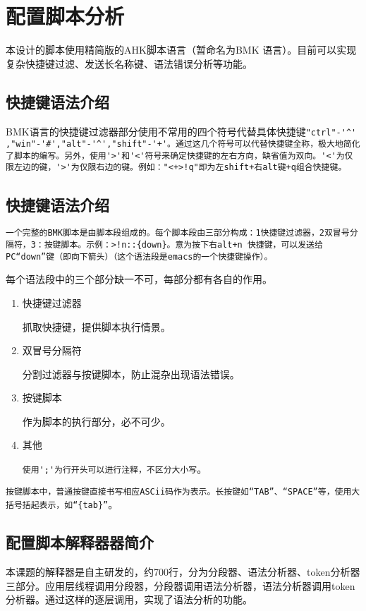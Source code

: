 \section{配置脚本分析}
本设计的脚本使用精简版的AHK脚本语言（暂命名为BMK 语言）。目前可以实现复杂快捷键过滤、发送长名称键、语法错误分析等功能。
\subsection{快捷键语法介绍}
BMK语言的快捷键过滤器部分使用不常用的四个符号代替具体快捷键\verb|"ctrl"-'^' ,"win"-'#',"alt"-'^',"shift"-'+'。通过这几个符号可以代替快捷键全称，极大地简化了脚本的编写。另外，使用'>'和'<'符号来确定快捷键的左右方向，缺省值为双向。'<'为仅限左边的键，'>'为仅限右边的键。例如："<+>!q"即为左shift+右alt键+q组合快捷键。|

\subsection{快捷键语法介绍}
\verb|一个完整的BMK脚本是由脚本段组成的。每个脚本段由三部分构成：1快捷键过滤器，2双冒号分隔符，3：按键脚本。示例：>!n::{down}。意为按下右alt+n 快捷键，可以发送给PC“down”键（即向下箭头）（这个语法段是emacs的一个快捷键操作）。|

每个语法段中的三个部分缺一不可，每部分都有各自的作用。
\begin{enumerate}
\item 快捷键过滤器

抓取快捷键，提供脚本执行情景。

\item 双冒号分隔符

分割过滤器与按键脚本，防止混杂出现语法错误。

\item 按键脚本

作为脚本的执行部分，必不可少。

\item 其他

\verb|使用';'为行开头可以进行注释，不区分大小写|。
\end{enumerate}

\verb|按键脚本中，普通按键直接书写相应ASCii码作为表示。长按键如“TAB”、“SPACE”等，使用大括号括起表示，如“{tab}”|。

\subsection{配置脚本解释器器简介}

本课题的解释器是自主研发的，约700行，分为分段器、语法分析器、token分析器三部分。应用层线程调用分段器，分段器调用语法分析器，语法分析器调用token分析器。通过这样的逐层调用，实现了语法分析的功能。



